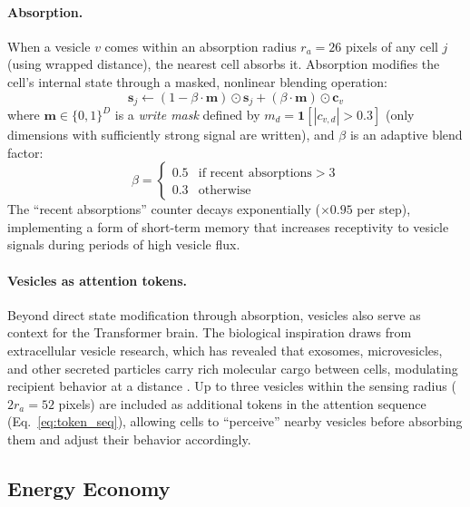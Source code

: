 \documentclass[10pt,twocolumn]{article}
\begin{document}
\paragraph{Absorption.}
When a vesicle $v$ comes within an absorption radius $r_a = 26$ pixels of any cell $j$ (using wrapped distance), the nearest cell absorbs it.
Absorption modifies the cell's internal state through a masked, nonlinear blending operation:
\begin{equation}
  \mathbf{s}_j \leftarrow (1 - \beta \cdot \mathbf{m}) \odot \mathbf{s}_j + (\beta \cdot \mathbf{m}) \odot \mathbf{c}_v
  \label{eq:vesicle_absorb}
\end{equation}
where $\mathbf{m} \in \{0, 1\}^D$ is a \emph{write mask} defined by $m_d = \mathbf{1}[|c_{v,d}| > 0.3]$ (only dimensions with sufficiently strong signal are written), and $\beta$ is an adaptive blend factor:
\begin{equation}
  \beta = \begin{cases} 0.5 & \text{if recent absorptions} > 3 \\ 0.3 & \text{otherwise} \end{cases}
  \label{eq:blend_factor}
\end{equation}
The ``recent absorptions'' counter decays exponentially ($\times 0.95$ per step), implementing a form of short-term memory that increases receptivity to vesicle signals during periods of high vesicle flux.

\paragraph{Vesicles as attention tokens.}
Beyond direct state modification through absorption, vesicles also serve as context for the Transformer brain.
The biological inspiration draws from extracellular vesicle research, which has revealed that exosomes, microvesicles, and other secreted particles carry rich molecular cargo between cells, modulating recipient behavior at a distance \cite{raposo2013extracellular,tkach2016communication,vanniel2018shedding}.
Up to three vesicles within the sensing radius ($2 r_a = 52$ pixels) are included as additional tokens in the attention sequence (Eq.~\ref{eq:token_seq}), allowing cells to ``perceive'' nearby vesicles before absorbing them and adjust their behavior accordingly.


\subsection{Energy Economy}
\label{sec:energy}
\end{document}
